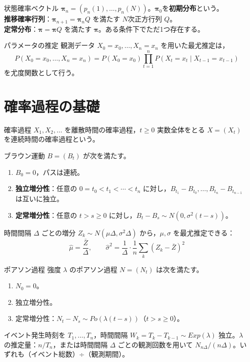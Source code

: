 \documentclass[a4paper,11pt]{ltjsarticle}
\begin{document}
\begin{term}{状態確率ベクトル}
$\bm\pi_n=(p_n(1),\dots,p_n(N))$。$\bm\pi_0$を\textbf{初期分布}という。\\
\textbf{推移確率行列}：$\bm\pi_{n+1}=\bm\pi_n Q$ を満たす $N$次正方行列 $Q$。\\
\textbf{定常分布}：$\bm\pi=\bm\pi Q$ を満たす $\bm\pi$。ある条件下でただ1つ存在する。
\end{term}

\begin{term}{パラメータの推定}
観測データ $X_0=x_0,\dots,X_n=x_n$ を用いた最尤推定は，
\[
P(X_0=x_0,\dots,X_n=x_n) = P(X_0=x_0)\prod_{t=1}^{n} P(X_t=x_t\mid X_{t-1}=x_{t-1})
\]
を尤度関数として行う。
\end{term}

\section{確率過程の基礎}

\begin{term}{確率過程}
$X_1,X_2,\dots$ を離散時間の確率過程，$t\ge 0$ 実数全体をとる $X=(X_t)$ を連続時間の確率過程という。
\end{term}

\begin{term}{ブラウン運動}
$B=(B_t)$ が次を満たす。
\begin{enumerate}[label=\arabic*.]
\item $B_0=0$，パスは連続。
\item \textbf{独立増分性}：任意の $0=t_0<t_1<\cdots<t_n$ に対し，$B_{t_1}-B_{t_0},\dots,B_{t_n}-B_{t_{n-1}}$ は互いに独立。
\item \textbf{定常増分性}：任意の $t>s\ge0$ に対し，$B_t-B_s \sim N(0,\sigma^2(t-s))$。
\end{enumerate}
時間間隔 $\Delta$ ごとの増分 $Z_k\sim N(\mu\Delta,\sigma^2\Delta)$ から，$\mu,\sigma$ を最尤推定できる：
\[
\hat\mu = \frac{\bar Z}{\Delta},\qquad \hat\sigma^2 = \frac{1}{\Delta}\cdot\frac1n\sum_k (Z_k-\bar Z)^2
\]
\end{term}

\begin{term}{ポアソン過程}
強度 $\lambda$ のポアソン過程 $N=(N_t)$ は次を満たす。
\begin{enumerate}[label=\arabic*.]
\item $N_0=0$。
\item 独立増分性。
\item 定常増分性：$N_t-N_s\sim Po(\lambda(t-s))$（$t>s\ge0$）。
\end{enumerate}
イベント発生時刻を $T_1,\dots,T_n$，時間間隔 $W_k=T_k-T_{k-1}\sim Exp(\lambda)$ 独立。$\lambda$ の推定量：$n/T_n$，または時間間隔 $\Delta$ ごとの観測回数を用いて $N_{n\Delta}/(n\Delta)$。いずれも（イベント総数）÷（観測期間）。
\end{term}
\end{document}
